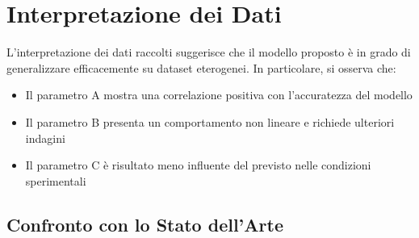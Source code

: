 \section{Interpretazione dei Dati}

L'interpretazione dei dati raccolti suggerisce che il modello proposto è in grado di generalizzare efficacemente su dataset eterogenei. In particolare, si osserva che:

\begin{itemize}
    \item Il parametro A mostra una correlazione positiva con l'accuratezza del modello
    \item Il parametro B presenta un comportamento non lineare e richiede ulteriori indagini
    \item Il parametro C è risultato meno influente del previsto nelle condizioni sperimentali
\end{itemize}

\subsection{Confronto con lo Stato dell'Arte}


